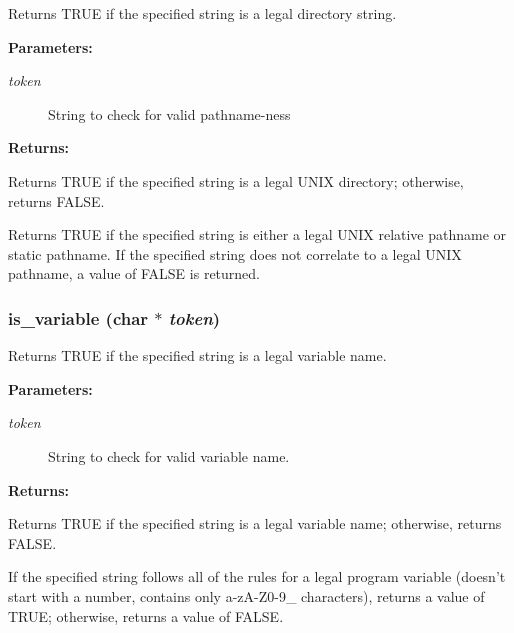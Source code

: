 Returns TRUE if the specified string is a legal directory string.

\begin{Desc}
\item[{\bf Parameters: }]\par
\begin{description}
\item[
{\em token}]String to check for valid pathname-ness \end{description}
\end{Desc}
\begin{Desc}
\item[{\bf Returns: }]\par
Returns TRUE if the specified string is a legal UNIX directory; otherwise, returns FALSE.

\end{Desc}
Returns TRUE if the specified string is either a legal UNIX relative pathname or static pathname. If the specified string does not correlate to a legal UNIX pathname, a value of FALSE is returned. 
\subsubsection{ is\_\-variable (char $\ast$ {\em token})}\label{util_8c_a8}


Returns TRUE if the specified string is a legal variable name.

\begin{Desc}
\item[{\bf Parameters: }]\par
\begin{description}
\item[
{\em token}]String to check for valid variable name. \end{description}
\end{Desc}
\begin{Desc}
\item[{\bf Returns: }]\par
Returns TRUE if the specified string is a legal variable name; otherwise, returns FALSE.

\end{Desc}
If the specified string follows all of the rules for a legal program variable (doesn't start with a number, contains only a-z\-A-Z0-9\_\- characters), returns a value of TRUE; otherwise, returns a value of FALSE. 
